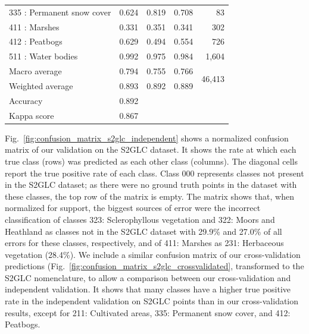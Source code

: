 \begin{table}[!hbt]
\begin{tabular}{@{}lrrrr@{}}
        335 : Permanent snow cover      & 0.624                             & 0.819                         & 0.708                        & 83                      \\
        411 : Marshes                   & 0.331                             & 0.351                         & 0.341                        & 302                     \\
        412 : Peatbogs                  & 0.629                             & 0.494                         & 0.554                        & 726                     \\
        511 : Water bodies              & 0.992                             & 0.975                         & 0.984                        & 1,604                    \\
        \midrule
        Macro average                   & 0.794                             & 0.755                         & 0.766                        & \multirow{2}{*}{46,413}      \\
        Weighted average                & 0.893                             & 0.892                         & 0.889                        &                             \\
        \midrule
        Accuracy                        & 0.892                             & \multicolumn{1}{l}{}          & \multicolumn{1}{l}{}         & \multicolumn{1}{l}{}        \\
        Kappa score                     & 0.867                             & \multicolumn{1}{l}{}          & \multicolumn{1}{l}{}         & \multicolumn{1}{l}{}       \\
        \bottomrule
        \end{tabular}
        \end{table}
        
        Fig.\@~\ref{fig:confusion_matrix_s2glc_independent} shows a normalized confusion matrix of our validation on the S2GLC dataset. It shows the rate at which each true class (rows) was predicted as each other class (columns). The diagonal cells report the true positive rate of each class. Class 000 represents classes not present in the S2GLC dataset; as there were no ground truth points in the dataset with these classes, the top row of the matrix is empty. The matrix shows that, when normalized for support, the biggest sources of error were the incorrect classification of classes 323: Sclerophyllous vegetation and 322: Moors and Heathland as classes not in the S2GLC dataset with 29.9\% and 27.0\% of all errors for these classes, respectively, and of 411: Marshes as 231: Herbaceous vegetation (28.4\%). We include a similar confusion matrix of our cross-validation predictions (Fig.\@~\ref{fig:confusion_matrix_s2glc_crossvalidated}, transformed to the S2GLC nomenclature, to allow a comparison between our cross-validation and independent validation. It shows that many classes have a higher true positive rate in the independent validation on S2GLC points than in our cross-validation results, except for 211: Cultivated areas, 335: Permanent snow cover, and 412: Peatbogs.
        
